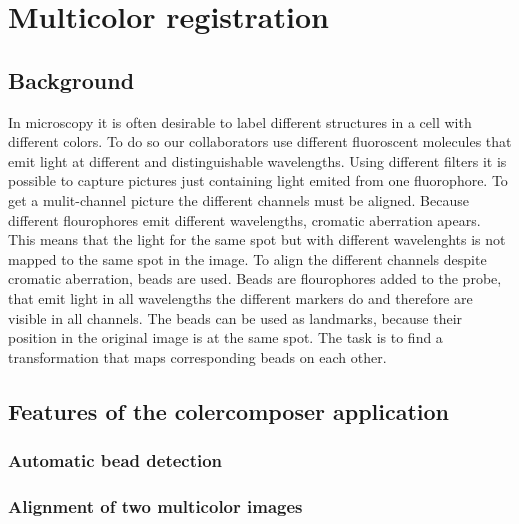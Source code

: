 \chapter{Multicolor registration}
\section{Background}
In microscopy it is often desirable to label different structures in a cell with
different colors. To do so our collaborators use different fluoroscent molecules
that emit light at different and distinguishable wavelengths. Using different
filters it is possible to capture pictures just containing light emited from one
fluorophore. To get a mulit-channel picture the different channels must be
aligned. Because different flourophores emit different wavelengths, cromatic
aberration apears. This means that the light for the same spot but with
different wavelenghts is not mapped to the same spot in the image. To align the
different channels despite cromatic aberration, beads are used. Beads are
flourophores added to the probe, that emit light in all wavelengths the
different markers do and therefore are visible in all channels. The beads can be
used as landmarks, because their position in the original image is at the same
spot. The task is to find a transformation that maps corresponding beads on each
other.
\section{Features of the colercomposer application}
\subsection{Automatic bead detection}
\subsection{Alignment of two multicolor images}
